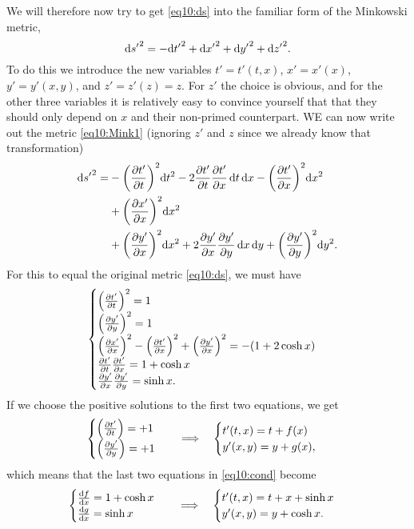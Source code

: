 \documentclass[11pt,a4paper, 
swedish, english %
]{article}
\begin{document}
We will therefore now try to get \eqref{eq10:ds} into the familiar
form of the Minkowski metric,
\begin{equation}\label{eq10:Mink1}
\mathrm{d}{s'}^2=-\mathrm{d}{t'}^2+\mathrm{d}{x'}^2+\mathrm{d}{y'}^2+\mathrm{d}{z'}^2.
\end{equation}
To do this we introduce the new variables $t'=t'(t,x)$, $x'=x'(x)$,
$y'=y'(x,y)$, and $z'=z'(z)=z$. For $z'$ the choice is obvious, and
for the other three variables it is relatively easy to convince
yourself that that they should only depend on $x$ and their non-primed
counterpart. WE can now write out the metric \eqref{eq10:Mink1}
(ignoring $z'$ and $z$ since we already know that transformation) 
\begin{equation}%
\begin{aligned}
\rd{s'}^2=&
-\qty(\pdv{t'}{t})^2\rd{t}^2-2\pdv{t'}{t}\pdv{t'}{x}\id{t}\id{x}
-\qty(\pdv{t'}{x})^2\rd{x}^2\\
&+\qty(\pdv{x'}{x})^2\rd{x}^2\\
&+\qty(\pdv{y'}{x})^2\rd{x}^2+2\pdv{y'}{x}\pdv{y'}{y}\id{x}\id{y}
+\qty(\pdv{y'}{y})^2\rd{y}^2.
\end{aligned}
\end{equation}
For this to equal the original metric \eqref{eq10:ds}, we must have
\begin{equation}\label{eq10:cond}
\begin{cases}
\qty(\pdv{t'}{t})^2=1\\
\qty(\pdv{y'}{y})^2=1\\
\qty(\pdv{x'}{x})^2-\qty(\pdv{t'}{x})^2+\qty(\pdv{y'}{x})^2
=-(1+2\cosh x)\\
\pdv{t'}{t}\pdv{t'}{x}=1+\cosh x\\
\pdv{y'}{x}\pdv{y'}{y}=\sinh x.
\end{cases}
\end{equation}
If we choose the positive solutions to the first two equations, we get
\begin{equation}
\begin{cases}
\qty(\pdv{t'}{t})=+1\\
\qty(\pdv{y'}{y})=+1\\
\end{cases}
\quad\Longrightarrow\quad
\begin{cases}
t'(t,x)=t+f(x)\\
y'(x,y)=y+g(x),
\end{cases}
\end{equation}
which means that the last two equations in \eqref{eq10:cond} become
\begin{equation}
\begin{cases}
\dv{f}{x}=1+\cosh x\\
\dv{g}{x}=\sinh x
\end{cases}
\quad\Longrightarrow\quad
\begin{cases}
t'(t,x)=t+x+\sinh x\\
y'(x,y)=y+\cosh x.
\end{cases}
\end{equation}
\end{document}
